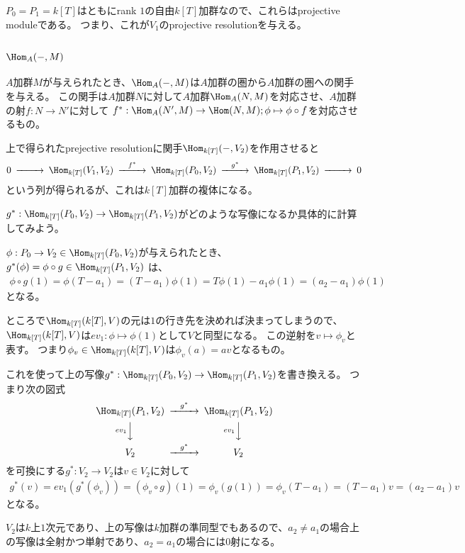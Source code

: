 \documentclass{jsarticle}
\begin{document}
$P_0=P_1=k[T]$はともにrank $1$の自由$k[T]$加群なので、これらはprojective moduleである。
つまり、これが$V_1$のprojective resolutionを与える。

\subsection{$\Hom_A(-,M)$}
$A$加群$M$が与えられたとき、$\Hom_A(-,M)$は$A$加群の圏から$A$加群の圏への関手を与える。
この関手は$A$加群$N$に対して$A$加群$\Hom_A(N,M)$を対応させ、$A$加群の射$f:N \to N'$に対して
$f^*:\Hom_A(N',M) \to \Hom(N,M); \phi \mapsto \phi\circ f$を対応させるもの。

上で得られたprejective resolutionに関手$\Hom_{k[T]}(-,V_2)$を作用させると
\[
\begin{CD}
0 @>>>  \Hom_{k[T]}(V_1,V_2) @>f^*>> \Hom_{k[T]}(P_0,V_2) @>g^*>> \Hom_{k[T]}(P_1,V_2) @>>> 0\\
\end{CD}
\]
という列が得られるが、これは$k[T]$加群の複体になる。

\begin{prob}
$g^*:\Hom_{k[T]}(P_0,V_2) \to \Hom_{k[T]}(P_1,V_2)$がどのような写像になるか具体的に計算してみよう。
\end{prob}
$\phi:P_0\to V_2\in \Hom_{k[T]}(P_0,V_2)$が与えられたとき、$g^*(\phi)=\phi\circ g\in\Hom_{k[T]}(P_1,V_2)$
は、
\begin{align*}
\phi\circ g(1)=\phi(T-a_1)=(T-a_1)\phi(1)=T\phi(1)-a_1\phi(1)=(a_2-a_1)\phi(1)
\end{align*}
となる。

ところで$\Hom_{k[T]}(k[T],V)$の元は$1$の行き先を決めれば決まってしまうので、
$\Hom_{k[T]}(k[T],V)$は$ev_1:\phi \mapsto \phi(1)$として$V$と同型になる。
この逆射を$v\mapsto \phi_v$と表す。
つまり$\phi_v\in \Hom_{k[T]}(k[T],V)$は$\phi_v(a)=av$となるもの。

これを使って上の写像$g^*:\Hom_{k[T]}(P_0,V_2) \to \Hom_{k[T]}(P_1,V_2)$を書き換える。
つまり次の図式
\[
\begin{CD}
\Hom_{k[T]}(P_1,V_2) @>g^*>>  \Hom_{k[T]}(P_1,V_2)\\
@Vev_1VV @Vev_1VV\\
V_2 @>g^*>> V_2
\end{CD}
\]
を可換にする$g^*:V_2 \to V_2$は$v\in V_2$に対して
\begin{align*}
g^*(v)=ev_1(g^*(\phi_v))=(\phi_v\circ g)(1)=\phi_v(g(1))=\phi_v(T-a_1)=(T-a_1)v=(a_2-a_1)v
\end{align*}
となる。

$V_2$は$k$上$1$次元であり、上の写像は$k$加群の準同型でもあるので、$a_2\neq a_1$の場合上の写像は全射かつ単射であり、$a_2=a_1$の場合には$0$射になる。
\end{document}
